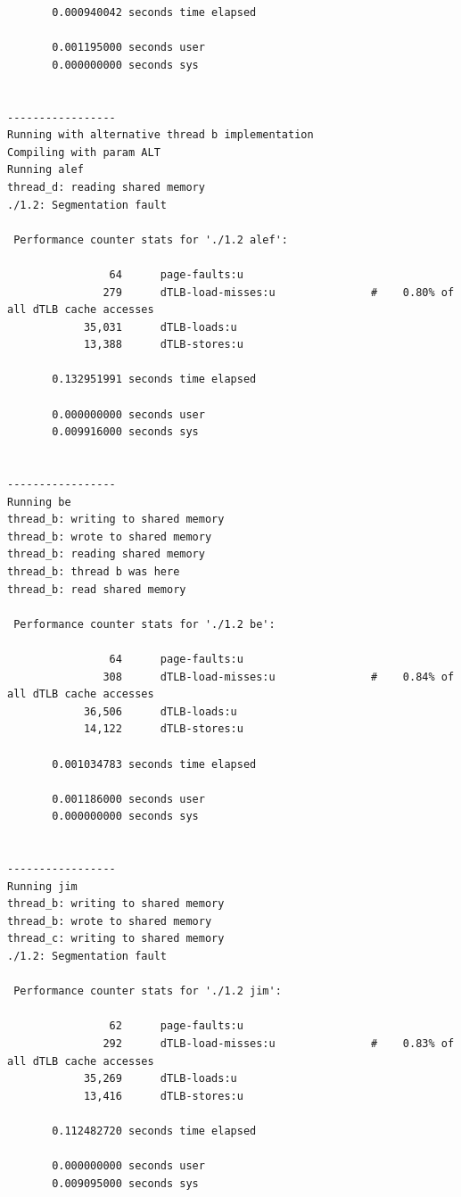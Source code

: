 \documentclass{article}
\begin{document}
\begin{latin}
\begin{lstlisting}
       0.000940042 seconds time elapsed

       0.001195000 seconds user
       0.000000000 seconds sys


-----------------
Running with alternative thread b implementation
Compiling with param ALT
Running alef
thread_d: reading shared memory
./1.2: Segmentation fault

 Performance counter stats for './1.2 alef':

                64      page-faults:u                                                         
               279      dTLB-load-misses:u               #    0.80% of all dTLB cache accesses
            35,031      dTLB-loads:u                                                          
            13,388      dTLB-stores:u                                                         

       0.132951991 seconds time elapsed

       0.000000000 seconds user
       0.009916000 seconds sys


-----------------
Running be
thread_b: writing to shared memory
thread_b: wrote to shared memory
thread_b: reading shared memory
thread_b: thread b was here
thread_b: read shared memory

 Performance counter stats for './1.2 be':

                64      page-faults:u                                                         
               308      dTLB-load-misses:u               #    0.84% of all dTLB cache accesses
            36,506      dTLB-loads:u                                                          
            14,122      dTLB-stores:u                                                         

       0.001034783 seconds time elapsed

       0.001186000 seconds user
       0.000000000 seconds sys


-----------------
Running jim
thread_b: writing to shared memory
thread_b: wrote to shared memory
thread_c: writing to shared memory
./1.2: Segmentation fault

 Performance counter stats for './1.2 jim':

                62      page-faults:u                                                         
               292      dTLB-load-misses:u               #    0.83% of all dTLB cache accesses
            35,269      dTLB-loads:u                                                          
            13,416      dTLB-stores:u                                                         

       0.112482720 seconds time elapsed

       0.000000000 seconds user
       0.009095000 seconds sys   
\end{lstlisting}
\end{latin}
\end{document}
